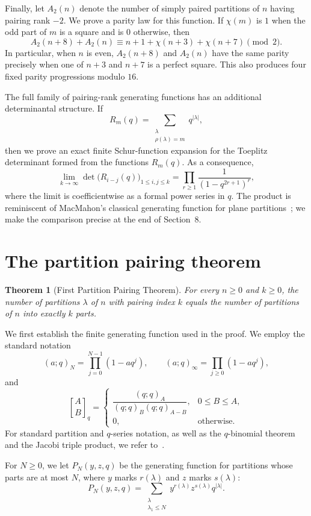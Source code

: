 \documentclass[11pt]{article}
\newtheorem{theorem}{Theorem}[section]
\theoremstyle{definition}
\theoremstyle{remark}
\newcommand{\qbinom}[3][]{%
  \genfrac{[}{]}{0pt}{}{#2}{#3}_{#1}%
}
\begin{document}
Finally, let $A_2(n)$ denote the number of simply paired partitions of $n$ having pairing rank $-2$.  We prove a parity law for this function.  If $\chi(m)$ is $1$ when the odd part of $m$ is a square and is $0$ otherwise, then
\[
 A_2(n+8)+A_2(n)
 \equiv n+1+\chi(n+3)+\chi(n+7)\pmod 2.
\]
In particular, when $n$ is even, $A_2(n+8)$ and $A_2(n)$ have the same parity precisely when one of $n+3$ and $n+7$ is a perfect square.  This also produces four fixed parity progressions modulo $16$.

The full family of pairing-rank generating functions has an additional
determinantal structure.  If
\[
 R_m(q)=\sum_{\substack{\lambda\\\rho(\lambda)=m}}q^{|\lambda|},
\]
then we prove an exact finite Schur-function expansion for the Toeplitz
determinant formed from the functions $R_m(q)$.  As a consequence,
\[
 \lim_{k\to\infty}
 \det\bigl(R_{i-j}(q)\bigr)_{1\leq i,j\leq k}
 =\prod_{r\geq1}\frac{1}{(1-q^{2r+1})^r},
\]
where the limit is coefficientwise as a formal power series in $q$.  The product is reminiscent of MacMahon's classical generating function for plane partitions~\cite{MacMahon1916}; we make the comparison precise at the end of Section~8.

\section{The partition pairing theorem}

\begin{theorem}[First Partition Pairing Theorem]\label{thm:pairing}
For every $n\ge 0$ and $k\ge 0$, the number of partitions $\lambda$ of $n$ with pairing index $k$ 
equals the number of partitions of $n$ into exactly $k$ parts.
\end{theorem}

We first establish the finite generating function used in the proof.  We employ the standard notation
\[
 (a;q)_N=\prod_{j=0}^{N-1}(1-aq^j),
 \qquad
 (a;q)_\infty=\prod_{j\ge0}(1-aq^j),
\]
and
\[
 \qbinom[q]{A}{B}
 =
 \begin{cases}
 \dfrac{(q;q)_A}{(q;q)_B(q;q)_{A-B}},&0\le B\le A,\\[6pt]
 0,&\text{otherwise}.
 \end{cases}
\]
For standard partition and $q$-series notation, as well as the $q$-binomial theorem and the Jacobi triple product, we refer to~\cite[Chapters~1--2]{AndrewsPartitions}.


For $N\ge0$, we let $P_N(y,z,q)$ be the generating function for partitions whose parts are at most $N$, where $y$ marks $r(\lambda)$ and $z$ marks $s(\lambda)$:
\[
 P_N(y,z,q)
 =\sum_{\substack{\lambda\\\lambda_1\le N}}
 y^{r(\lambda)}z^{s(\lambda)}q^{|\lambda|}.
\]
\end{document}
